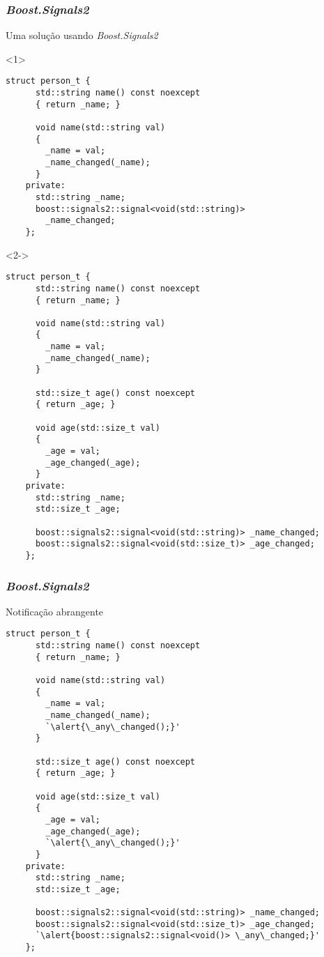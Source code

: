 \documentclass[t]{beamer}
\begin{document}
\begin{frame}[fragile]
  \frametitle{\textit{Boost.Signals2}}
  Uma solução usando \textit{Boost.Signals2}

  \begin{onlyenv}<1>
  \begin{lstlisting}[escapeinside=`']
    struct person_t {
      std::string name() const noexcept
      { return _name; }
      
      void name(std::string val)
      {
        _name = val;
        _name_changed(_name);
      }
    private:    
      std::string _name;
      boost::signals2::signal<void(std::string)>
        _name_changed;
    };
  \end{lstlisting}
  \end{onlyenv}

  \begin{onlyenv}<2->
  \begin{lstlisting}[basicstyle=\tiny]
    struct person_t {
      std::string name() const noexcept
      { return _name; }
      
      void name(std::string val)
      {
        _name = val;
        _name_changed(_name);
      }

      std::size_t age() const noexcept
      { return _age; }
      
      void age(std::size_t val)
      {
        _age = val;
        _age_changed(_age);
      }
    private:    
      std::string _name;
      std::size_t _age;

      boost::signals2::signal<void(std::string)> _name_changed;
      boost::signals2::signal<void(std::size_t)> _age_changed;
    };
  \end{lstlisting}
  \end{onlyenv}
\end{frame}

\begin{frame}[fragile]
  \frametitle{\textit{Boost.Signals2}}
  Notificação abrangente

  \begin{lstlisting}[basicstyle=\tiny,escapeinside=`']
    struct person_t {
      std::string name() const noexcept
      { return _name; }
      
      void name(std::string val)
      {
        _name = val;
        _name_changed(_name);
        `\alert{\_any\_changed();}' 
      }

      std::size_t age() const noexcept
      { return _age; }
      
      void age(std::size_t val)
      {
        _age = val;
        _age_changed(_age);
        `\alert{\_any\_changed();}' 
      }
    private:    
      std::string _name;
      std::size_t _age;

      boost::signals2::signal<void(std::string)> _name_changed;
      boost::signals2::signal<void(std::size_t)> _age_changed;
      `\alert{boost::signals2::signal<void()> \_any\_changed;}'
    };
  \end{lstlisting}
\end{frame}
\end{document}
